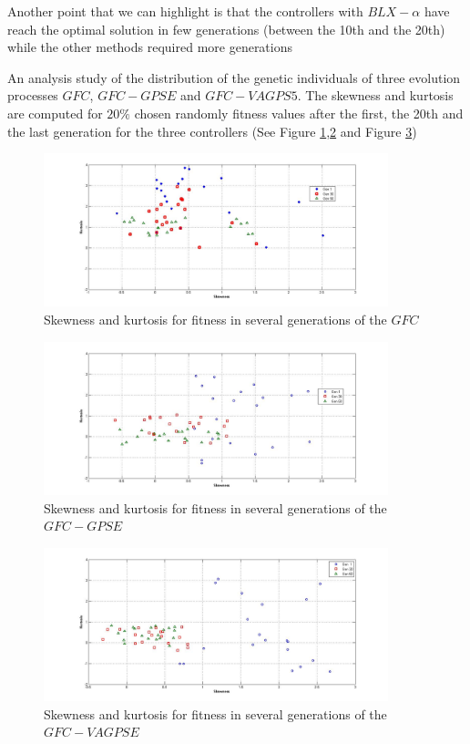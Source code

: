 \documentclass[10pt,journal,compsoc]{IEEEtran}
\begin{document}
Another point that we can highlight is that the controllers with $BLX-\alpha$ have reach the optimal solution in few generations (between the 10th and the 20th) while the other methods required more generations



An analysis study of the distribution  of the genetic individuals of three evolution processes $GFC$, $GFC-GPSE$ and $GFC-VAGPS5$.
The skewness and kurtosis are computed for $20\%$ chosen randomly fitness values after the first, the 20th and the last generation for the three controllers (See Figure \ref{fig:gfcsk},\ref{fig:gfcrsesk} and Figure \ref{fig:gfcvarsesk})


\begin{figure}[!ht]	
	\begin{center}
		\includegraphics[width=10cm]{fig/gfc.jpg}
		\caption{Skewness and kurtosis for fitness in several generations
			of the  $GFC$}
		\label{fig:gfcsk}	
	\end{center}	
\end{figure}
\begin{figure}[!ht]	
	\begin{center}
		\includegraphics[width=10cm]{fig/gfcrse.jpg}
		\caption{Skewness and kurtosis for fitness in several generations
			of the  $GFC-GPSE$}
		\label{fig:gfcrsesk}	
	\end{center}	
\end{figure}
\begin{figure}[!ht]	
	\begin{center}
		\includegraphics[width=10cm]{fig/gfcvarse.jpg}
		\caption{Skewness and kurtosis for fitness in several generations
			of the  $GFC-VAGPSE$}
		\label{fig:gfcvarsesk}	
	\end{center}	
\end{figure}
\end{document}
